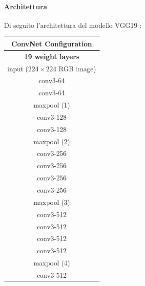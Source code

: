         \paragraph{Architettura}
        Di seguito l'architettura del modello VGG19 \cite{simonyan2014very}:\\
            \begin{table} [!h]
                \centering
                \begin{tabular}{|c|}
                    \hline 
                    ConvNet Configuration\\
                    \hline \hline
                    \rule[-3mm]{0mm}{8mm}
                    \textbf{19 weight layers}\\
                    \hline
                    \hline
                    \rule[-3mm]{0mm}{8mm}
                    input ($224\times224$ RGB image)\\
                    \hline
                    conv3-64\\
                    conv3-64\\
                    \hline 
                    \rule[-3mm]{0mm}{8mm}
                    maxpool (1)\\
                    \hline 
                    conv3-128\\
                    conv3-128\\
                    \hline  
                    \rule[-3mm]{0mm}{8mm}
                    maxpool (2)\\
                    \hline 
                    conv3-256\\
                    conv3-256\\
                    conv3-256\\
                    conv3-256\\
                    \hline 
                    \rule[-3mm]{0mm}{8mm}
                    maxpool (3)\\
                    \hline 
                    conv3-512\\
                    conv3-512\\
                    conv3-512\\
                    conv3-512\\
                    \hline 
                    \rule[-3mm]{0mm}{8mm}
                    maxpool (4)\\
                    \hline 
                    conv3-512\\

\end{tabular}
\end{table}
